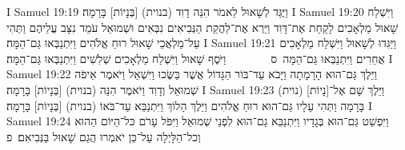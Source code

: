 I Samuel 19:19	וַיֻּגַּד לְשָׁאוּל לֵאמֹר הִנֵּה דָוִד (בנוית) [בְּנָיוֹת] בָּרָמָה׃
I Samuel 19:20	וַיִּשְׁלַח שָׁאוּל מַלְאָכִים לָקַחַת אֶת־דָּוִד וַיַּרְא אֶת־לַהֲקַת הַנְּבִיאִים נִבְּאִים וּשְׁמוּאֵל עֹמֵד נִצָּב עֲלֵיהֶם וַתְּהִי עַל־מַלְאֲכֵי שָׁאוּל רוּחַ אֱלֹהִים וַיִּתְנַבְּאוּ גַּם־הֵמָּה׃
I Samuel 19:21	וַיַּגִּדוּ לְשָׁאוּל וַיִּשְׁלַח מַלְאָכִים אֲחֵרִים וַיִּתְנַבְּאוּ גַּם־הֵמָּה {ס}        וַיֹּסֶף שָׁאוּל וַיִּשְׁלַח מַלְאָכִים שְׁלִשִׁים וַיִּתְנַבְּאוּ גַּם־הֵמָּה׃
I Samuel 19:22	וַיֵּלֶךְ גַּם־הוּא הָרָמָתָה וַיָּבֹא עַד־בּוֹר הַגָּדוֹל אֲשֶׁר בַּשֶּׂכוּ וַיִּשְׁאַל וַיֹּאמֶר אֵיפֹה שְׁמוּאֵל וְדָוִד וַיֹּאמֶר הִנֵּה (בנוית) [בְּנָיוֹת] בָּרָמָה׃
I Samuel 19:23	וַיֵּלֶךְ שָׁם אֶל־[נָיוֹת] (נוית) בָּרָמָה וַתְּהִי עָלָיו גַּם־הוּא רוּחַ אֱלֹהִים וַיֵּלֶךְ הָלוֹךְ וַיִּתְנַבֵּא עַד־בֹּאוֹ (בנוית) [בְּנָיוֹת] בָּרָמָה׃
I Samuel 19:24	וַיִּפְשַׁט גַּם־הוּא בְּגָדָיו וַיִּתְנַבֵּא גַם־הוּא לִפְנֵי שְׁמוּאֵל וַיִּפֹּל עָרֹם כּל־הַיּוֹם הַהוּא וְכל־הַלָּיְלָה עַל־כֵּן יֹאמְרוּ הֲגַם שָׁאוּל בַּנְּבִיאִם׃ {פ}
